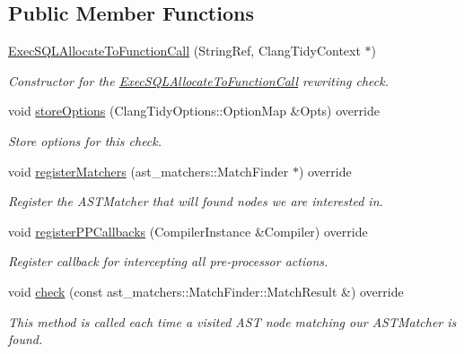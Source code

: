\subsection*{Public Member Functions}
\begin{DoxyCompactItemize}
\item 
\hyperlink{classclang_1_1tidy_1_1pagesjaunes_1_1_exec_s_q_l_allocate_to_function_call_aa46155f099743916f57a31170e7f7d5b}{Exec\+S\+Q\+L\+Allocate\+To\+Function\+Call} (String\+Ref, Clang\+Tidy\+Context $\ast$)
\begin{DoxyCompactList}\small\item\em Constructor for the \hyperlink{classclang_1_1tidy_1_1pagesjaunes_1_1_exec_s_q_l_allocate_to_function_call}{Exec\+S\+Q\+L\+Allocate\+To\+Function\+Call} rewriting check. \end{DoxyCompactList}\item 
void \hyperlink{classclang_1_1tidy_1_1pagesjaunes_1_1_exec_s_q_l_allocate_to_function_call_ab85817e7ca5bfba6f3e690d8a721feaa}{store\+Options} (Clang\+Tidy\+Options\+::\+Option\+Map \&Opts) override
\begin{DoxyCompactList}\small\item\em Store options for this check. \end{DoxyCompactList}\item 
void \hyperlink{classclang_1_1tidy_1_1pagesjaunes_1_1_exec_s_q_l_allocate_to_function_call_af16d22e2120db4877389e64e7842f968}{register\+Matchers} (ast\+\_\+matchers\+::\+Match\+Finder $\ast$) override
\begin{DoxyCompactList}\small\item\em Register the A\+S\+T\+Matcher that will found nodes we are interested in. \end{DoxyCompactList}\item 
void \hyperlink{classclang_1_1tidy_1_1pagesjaunes_1_1_exec_s_q_l_allocate_to_function_call_a80535f19a5d3af09313adf439a679942}{register\+P\+P\+Callbacks} (Compiler\+Instance \&Compiler) override
\begin{DoxyCompactList}\small\item\em Register callback for intercepting all pre-\/processor actions. \end{DoxyCompactList}\item 
void \hyperlink{classclang_1_1tidy_1_1pagesjaunes_1_1_exec_s_q_l_allocate_to_function_call_a2c06ff6f41a7d975b218fb97a002db5c}{check} (const ast\+\_\+matchers\+::\+Match\+Finder\+::\+Match\+Result \&) override
\begin{DoxyCompactList}\small\item\em This method is called each time a visited A\+ST node matching our A\+S\+T\+Matcher is found. \end{DoxyCompactList}\end{DoxyCompactItemize}
